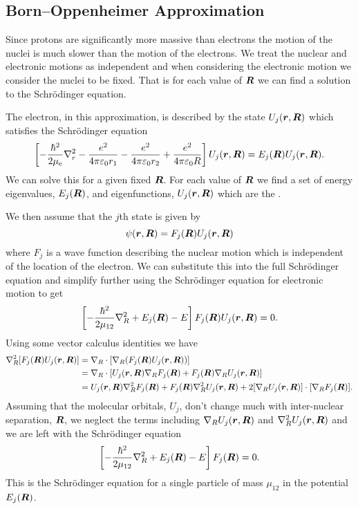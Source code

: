 \documentclass[a4paper]{article}
\newcommand{\Pe}{\mathrm{e}}
\begin{document}
    \subsection{Born--Oppenheimer Approximation}
    Since protons are significantly more massive than electrons the motion of the nuclei is much slower than the motion of the electrons.
    We treat the nuclear and electronic motions as independent and when considering the electronic motion we consider the nuclei to be fixed.
    That is for each value of \(\bm{R}\) we can find a solution to the Schr\"odinger equation.
    
    The electron, in this approximation, is described by the state \(U_j(\bm{r}, \bm{R})\) which satisfies the Schr\"odinger equation
    \[\left[ -\frac{\hbar^2}{2\mu_{\Pe}}\grad_r^2 - \frac{e^2}{4\pi\varepsilon_0r_1} - \frac{e^2}{4\pi\varepsilon_0r_2} + \frac{e^2}{4\pi\varepsilon_0R} \right]U_j(\vv{r}, \vv{R}) = E_j(\vv{R})U_j(\vv{r}, \vv{R}).\]
    We can solve this for a given fixed \(\bm{R}\).
    For each value of \(\bm{R}\) we find a set of energy eigenvalues, \(E_j(\bm{R})\), and eigenfunctions, \(U_j(\bm{r}, \bm{R})\) which are the .
    
    We then assume that the \(j\)th state is given by
    \[\psi(\bm{r}, \bm{R}) = F_j(\bm{R})U_j(\bm{r}, \bm{R})\]
    where \(F_j\) is a wave function describing the nuclear motion which is independent of the location of the electron.
    We can substitute this into the full Schr\"odinger equation and simplify further using the Schr\"odinger equation for electronic motion to get
    \[\left[ -\frac{\hbar^2}{2\mu_{12}}\nabla_R^2 + E_j(\bm{R}) - E \right]F_j(\bm{R})U_j(\bm{r}, \bm{R}) = 0.\]
    Using some vector calculus identities we have
    \begin{align*}
        \nabla_{R}^2[F_j(\bm{R}) U_j(\bm{r}, \bm{R})] &= \nabla_R \cdot [\nabla_R (F_j(\bm{R})U_j(\bm{r}, \bm{R}))]\\
        &= \nabla_R \cdot [U_j(\bm{r}, \bm{R}) \nabla_R F_j(\bm{R}) + F_j(\bm{R})\nabla_R U_j(\bm{r}, \bm{R})]\\
        &= U_j(\bm{r}, \bm{R})\nabla_R^2F_j(\bm{R}) + F_j(\bm{R})\nabla_R^2U_j(\bm{r}, \bm{R}) + 2 [\nabla_RU_j(\bm{r}, \bm{R})]\cdot[\nabla_RF_j(\bm{R})].
    \end{align*}
    Assuming that the molecular orbitals, \(U_j\), don't change much with inter-nuclear separation, \(\bm{R}\), we neglect the terms including \(\nabla_RU_j(\bm{r}, \bm{R})\) and \(\nabla_R^2U_j(\bm{r}, \bm{R})\) and we are left with the Schr\"odinger equation
    \[\left[ -\frac{\hbar^2}{2\mu_{12}}\nabla_R^2 + E_j(\bm{R}) - E \right]F_j(\bm{R}) = 0.\]
    This is the Schr\"odinger equation for a single particle of mass \(\mu_{12}\) in the potential \(E_j(\bm{R})\).
    
\end{document}
